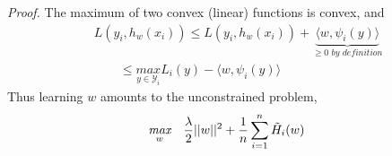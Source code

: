 \documentclass{article}
\begin{document}
\textit{Proof.} The maximum of two convex (linear) functions is convex, and
\begin{equation*}
\begin{aligned}
    &L(y_{i},h_{w}(x_{i})) \leq L(y_{i},h_{w}(x_{i})) + \underbrace{\langle w, \psi_{i}(y)\rangle}_{\geq 0 \textit{ by definition}} \\
    &\quad\quad\leq \underset{y\in\mathcal{Y}_{i}}{\textit{max}} L_{i}(y)- \langle w, \psi_{i}(y)\rangle
\end{aligned}
\end{equation*}
Thus learning $w$ amounts to the unconstrained problem,
\begin{equation*}
\begin{aligned}
    &\underset{w}{\textit{max}}\quad\frac{\lambda}{2}||w||^{2}+ \frac{1}{n}\sum_{i=1}^{n}\Tilde{H}_{i}(w)
\end{aligned}
\end{equation*}
\end{document}
